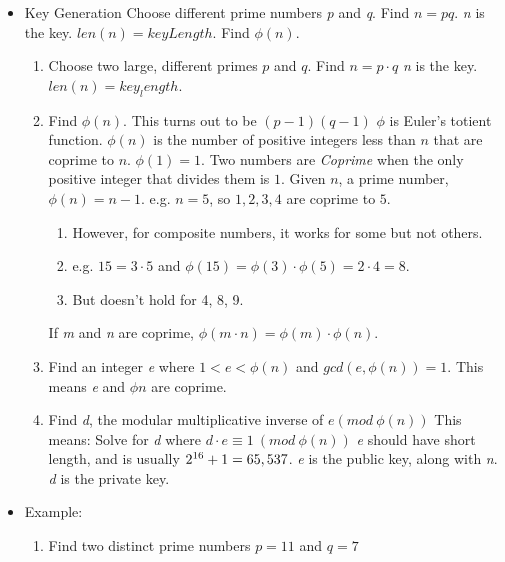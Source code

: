 \documentclass{article}
\begin{document}
\begin{itemize}
\begin{itemize}
      \item Key Generation
        \subitem Choose different prime numbers \emph{p} and \emph{q}. Find $ n = pq $.
        \subitem \emph{n} is the key. $ len(n) = keyLength $.
        \subitem Find $ \phi(n) $.
        \begin{enumerate}
          \item Choose two large, different primes $ p $ and $ q $. Find $ n = p \cdot q $
            \subitem \emph{n} is the key. $ len(n) = key_length $.
          \item Find $ \phi(n) $. This turns out to be $ (p - 1) (q - 1) $
            \subitem $ \phi $ is Euler's totient function. $ \phi(n) $ is the number of
            positive integers less than $ n $ that are coprime to $ n $. $ \phi(1) = 1$.
            \subitem Two numbers are \emph{Coprime} when the only positive integer that divides them is $ 1 $. 
            \subitem Given $ n $, a prime number, $ \phi(n) = n-1 $. e.g. $ n = 5 $, so $ 1, 2, 3, 4 $ are coprime to $ 5 $. 
            \begin{enumerate}
              \item However, for composite numbers, it works for some but not others. 
              \item e.g. $ 15 = 3 \cdot 5 $ and $ \phi(15) = \phi(3) \cdot \phi(5) = 2 \cdot 4 = 8 $. 
              \item But doesn't hold for 4, 8, 9. 
            \end{enumerate}
            \subitem If \emph{m} and \emph{n} are coprime, $ \phi(m \cdot n) = \phi(m) \cdot \phi(n) $.
          \item Find an integer \emph{e} where $ 1 < e < \phi(n) $ and $ gcd(e, \phi(n)) = 1 $. This means \emph{e} and $ \phi{n} $ are coprime.
          \item Find \emph{d}, the modular multiplicative inverse of $ e(mod\ \phi(n)) $
            \subitem This means: Solve for \emph{d} where $ d \cdot e \equiv 1\ (mod\ \phi(n)) $
            \subitem \emph{e} should have short length, and is usually $ 2\textsuperscript{16} + 1 = 65,537 $.
            \subitem \emph{e} is the public key, along with \emph{n}.
            \subitem \emph{d} is the private key.
        \end{enumerate}
      \item Example:
        \begin{enumerate}
          \item Find two distinct prime numbers
            \subitem $ p = 11 $ and $ q = 7 $

\end{enumerate}
\end{itemize}
\end{itemize}
\end{document}
